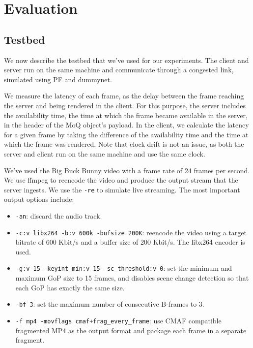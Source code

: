 
\chapter{Evaluation}\label{chapter:evaluation}

\section{Testbed}
We now describe the testbed that we've used for our experiments. The client and server run on the same machine and communicate through a congested link, simulated using PF and dummynet.

We measure the latency of each frame, as the delay between the frame reaching the server and being rendered in the client. For this purpose, the server includes the availability time, the time at which the frame became available in the server, in the header of the MoQ object's payload. In the client, we calculate the latency for a given frame by taking the difference of the availability time and the time at which the frame was rendered. Note that clock drift is not an issue, as both the server and client run on the same machine and use the same clock.

We've used the Big Buck Bunny video %
with a frame rate of 24 frames per second. We use ffmpeg to reencode the video and produce the output stream that the server ingests. We use the \lstinline{-re} to simulate live streaming. The most important output options include:

\begin{itemize}
    \item \lstinline{-an}: discard the audio track.
    \item \lstinline{-c:v libx264 -b:v 600k -bufsize 200K}: reencode the video using a target bitrate of 600 Kbit/s and a buffer size of 200 Kbit/s. The libx264 encoder is used.
    \item \lstinline{-g:v 15 -keyint_min:v 15 -sc_threshold:v 0}: set the minimum and maximum GoP size to 15 frames, and disables scene change detection so that each GoP has exactly the same size. 
    \item \lstinline{-bf 3}: set the maximum number of consecutive B-frames to 3.
    \item \lstinline{-f mp4 -movflags cmaf+frag_every_frame}: use \ac{CMAF} compatible fragmented MP4 as the output format and package each frame in a separate fragment.
\end{itemize}

